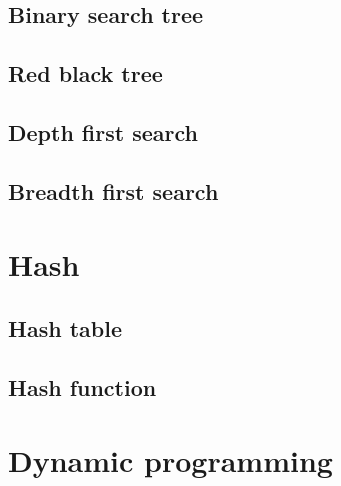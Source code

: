 \documentclass{article}
\begin{document}
	\subsection{Binary search tree}
	\subsection{Red black tree}
	\subsection{Depth first search}
	\subsection{Breadth first search}

\section{Hash}
	\subsection{Hash table}
	\subsection{Hash function}

\section{Dynamic programming}
\end{document}

